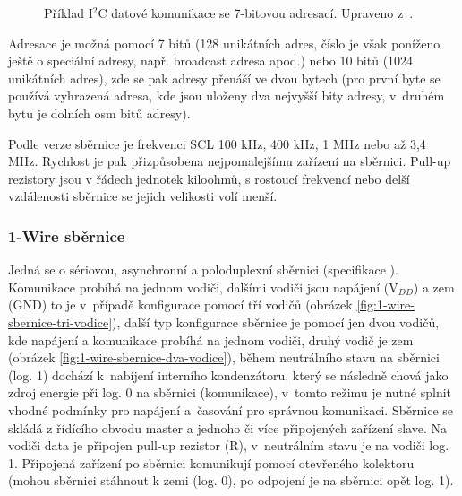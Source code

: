 \begin{figure}[H]
    \centering
    \def\svgwidth{\columnwidth}
    
    \caption[Příklad I$^2$C datové komunikace se 7-bitovou adresací.]{Příklad I$^2$C datové komunikace se 7-bitovou adresací. Upraveno z~\cite{i2c-sbernice-datovy-paket-7bit-adresa}.}
    \label{fig:i2c-sbernice-datova-komunikace-7bit-adresa}
\end{figure}

Adresace je možná pomocí 7 bitů (128 unikátních adres, číslo je však poníženo ještě o speciální adresy, např. broadcast adresa apod.) nebo 10 bitů (1024 unikátních adres), zde se pak adresy přenáší ve dvou bytech (pro první byte se používá vyhrazená adresa, kde jsou uloženy dva nejvyšší bity adresy, v~druhém bytu je dolních osm bitů adresy).  \cite{dudka-i2c-relativene-jednoduse} \cite{tisnovsky-komunikace-po-seriove-sbernici-i2c}

Podle verze sběrnice je frekvenci SCL 100 kHz, 400 kHz, 1 MHz nebo až 3,4 MHz. Rychlost je pak přizpůsobena nejpomalejšímu zařízení na sběrnici. Pull-up rezistory jsou v řádech jednotek kiloohmů, s rostoucí frekvencí nebo delší vzdálenosti sběrnice se jejich velikosti volí menší. \cite{olejar-strucny-popis-sbernice-i2c}




\subsubsection{1-Wire sběrnice}
\label{sec:1-wire-sbernice}
Jedná se o sériovou, asynchronní a poloduplexní sběrnici (specifikace \cite{1-wire-sbernice-specifikace}). Komunikace probíhá na jednom vodiči, dalšími vodiči jsou napájení (V$_{DD}$) a zem (GND) to je v~případě konfigurace pomocí tří vodičů (obrázek \ref{fig:1-wire-sbernice-tri-vodice}), další typ konfigurace sběrnice je pomocí jen dvou vodičů, kde napájení a komunikace probíhá na jednom vodiči, druhý vodič je zem (obrázek \ref{fig:1-wire-sbernice-dva-vodice}), během neutrálního stavu na sběrnici (log. 1) dochází k~nabíjení interního kondenzátoru, který se následně chová jako zdroj energie při log. 0 na sběrnici (komunikace), v~tomto režimu je nutné splnit vhodné podmínky pro napájení a~časování pro správnou komunikaci. Sběrnice se skládá z řídícího obvodu master a jednoho či více připojených zařízení slave. Na vodiči data je připojen pull-up rezistor (R), v~neutrálním stavu je na vodiči log. 1. Připojená zařízení po sběrnici komunikují pomocí otevřeného kolektoru (mohou sběrnici stáhnout k zemi (log. 0), po odpojení je na sběrnici opět log. 1). \cite{maly-1-wire-sbernice}

